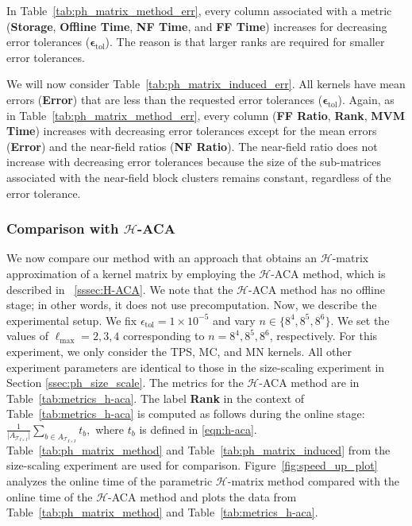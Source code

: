 \documentclass[final,3p,times]{elsarticle}
\newcommand{\mc}[1]{\mathcal{#1}}
\begin{document}
In Table~\ref{tab:ph_matrix_method_err}, every column associated with a metric (\textbf{Storage}, \textbf{Offline Time}, \textbf{NF Time}, and \textbf{FF Time}) increases for decreasing error tolerances ($\mathbf{\epsilon}_{\text{tol}}$). The reason is that  larger ranks are required for smaller error tolerances.


We will now consider Table~\ref{tab:ph_matrix_induced_err}. All kernels have mean errors (\textbf{Error}) that are less than the requested error tolerances ($\mathbf{\epsilon}_{\text{tol}}$). Again, as in Table~\ref{tab:ph_matrix_method_err}, every column (\textbf{FF Ratio}, \textbf{Rank}, \textbf{MVM Time}) increases with decreasing error tolerances except for the mean errors (\textbf{Error}) and the near-field ratios (\textbf{NF Ratio}). The near-field ratio does not increase with decreasing error tolerances because the size of the sub-matrices associated with the near-field block clusters remains constant, regardless of the error tolerance. 




\subsubsection{Comparison with \texorpdfstring{$\mc{H}$}{H}-ACA}
 We now compare our method with an approach that obtains an $\mc{H}$-matrix approximation of a kernel matrix by employing the $\mc{H}$-ACA method, which is described in ~\ref{sssec:H-ACA}. We note that the $\mc{H}$-ACA method has no offline stage; in other words, it does not use precomputation. Now, we describe the experimental setup. We fix $\epsilon_{\text{tol}} = 1 \times 10^{-5}$ and vary  $n \in \{8^4, 8^5, 8^6\}$. We set the values of $\ell_{\max} = 2, 3, 4$ corresponding to $n = 8^4, 8^5, 8^6$, respectively. For this experiment, we only consider the TPS, MC, and MN kernels. All other experiment parameters are identical to those in the size-scaling experiment in Section \ref{ssec:ph_size_scale}. The metrics for the $\mc{H}$-ACA method are in Table~\ref{tab:metrics_h-aca}. The label \textbf{Rank} in the context of Table~\ref{tab:metrics_h-aca} is computed as follows during the online stage: 
 $\frac{1}{\big|A_{\mathcal{T}_{I\times I}}\big|}\sum_{b\in A_{\mathcal{T}_{I\times I}}}t_{b}, $
 where  $t_{b}$ is defined in \eqref{eqn:h-aca}. Table~\ref{tab:ph_matrix_method} and Table~\ref{tab:ph_matrix_induced} from the size-scaling experiment are used for comparison. Figure~\ref{fig:speed_up_plot} analyzes the online time of the parametric $\mc{H}$-matrix method compared with the online time of the $\mc{H}$-ACA method and plots the data from Table~\ref{tab:ph_matrix_method} and Table~\ref{tab:metrics_h-aca}.
 
\end{document}
